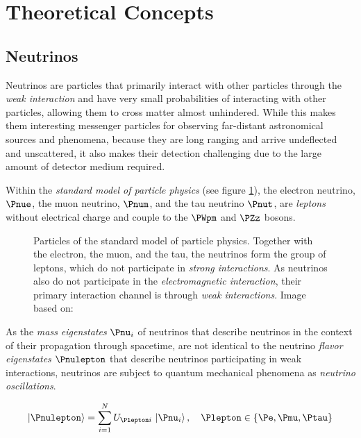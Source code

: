 \section{Theoretical Concepts}
\label{sec:theoretical_background}

\subsection{Neutrinos}
\label{sec:neutrinos}

Neutrinos are particles that primarily interact with other particles
through the \textit{weak interaction} and have very small probabilities
of interacting with other particles, allowing them to cross matter
almost unhindered. While this makes them interesting messenger particles
for observing far-distant astronomical sources and phenomena, because
they are long ranging and arrive undeflected and unscattered, it also
makes their detection challenging due to the large amount of detector
medium required. \cite{lexikonderphysik, instrumentation}

Within the \textit{standard model of particle physics} (see figure
\ref{fig:Pheith9i}), the electron neutrino, \(\Pnue\), the muon
neutrino, \(\Pnum\), and the tau neutrino \(\Pnut\), are
\textit{leptons} without electrical charge and couple to the \(\PWpm\)
and \(\PZz\) bosons.

\begin{figure}[htbp]
  \caption{Particles of the standard model of particle physics. Together with the electron, the muon, and the tau, the neutrinos form the group of leptons, which do not participate in \textit{strong interactions}. As neutrinos also do not participate in the \textit{electromagnetic interaction}, their primary interaction channel is through \textit{weak interactions}. Image based on: \cite{standardmodel}}
  \label{fig:Pheith9i}
\end{figure}

As the \textit{mass eigenstates} \(\Pnu_i\) of neutrinos that describe
neutrinos in the context of their propagation through spacetime, are not
identical to the neutrino \textit{flavor eigenstates} \(\Pnulepton\)
that describe neutrinos participating in weak interactions, neutrinos
are subject to quantum mechanical phenomena as
\textit{neutrino oscillations}. \cite{particledatareview}

\[
  \ket{\Pnulepton} = \sum_{i=1}^N U_{\Plepton i}\,\ket{\Pnu_i}, \ \ \ \Plepton \in \{ \Pe, \Pmu, \Ptau \}
\]

